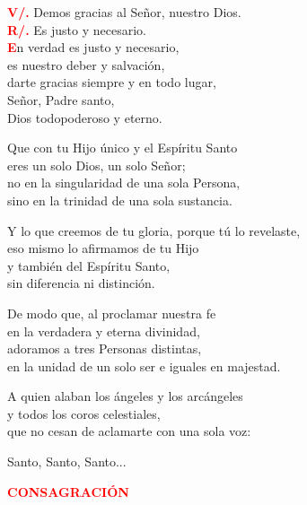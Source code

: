 \documentclass[12pt, letterpaper, spanish]{report}
\begin{document}
\Large \hspace{-0.9cm} {\bfseries \textcolor{red}{V/.}} \hspace{0.5cm} Demos gracias al Se\~nor, nuestro Dios. \\
\Large \hspace{-0.9cm} {\bfseries \textcolor{red}{R/.}} \hspace{0.5cm} Es justo y necesario. \\

\Large \lettrine{\bfseries \textcolor{red}{E}}{}n verdad es justo y necesario,\\
es nuestro deber y salvaci\'on,\\
darte gracias siempre y en todo lugar,\\
Se\~nor, Padre santo,\\
Dios todopoderoso y eterno.\newline

Que con tu Hijo \'unico y el Esp\'iritu Santo\\
eres un solo Dios, un solo Se\~nor;\\
no en la singularidad de una sola Persona,\\
sino en la trinidad de una sola sustancia.\newline

Y lo que creemos de tu gloria, porque t\'u lo revelaste,\\
eso mismo lo afirmamos de tu Hijo\\
y tambi\'en del Esp\'iritu Santo,\\
sin diferencia ni distinci\'on.\newline

De modo que, al proclamar nuestra fe\\
en la verdadera y eterna divinidad,\\
adoramos a tres Personas distintas,\\
en la unidad de un solo ser e iguales en majestad.\newline

A quien alaban los \'angeles y los arc\'angeles\\
y todos los coros celestiales,\\
que no cesan de aclamarte con una sola voz:\newline

Santo, Santo, Santo...\newline

\Large {\bfseries \textcolor{red}{CONSAGRACI\'ON}} \newline
\end{document}
